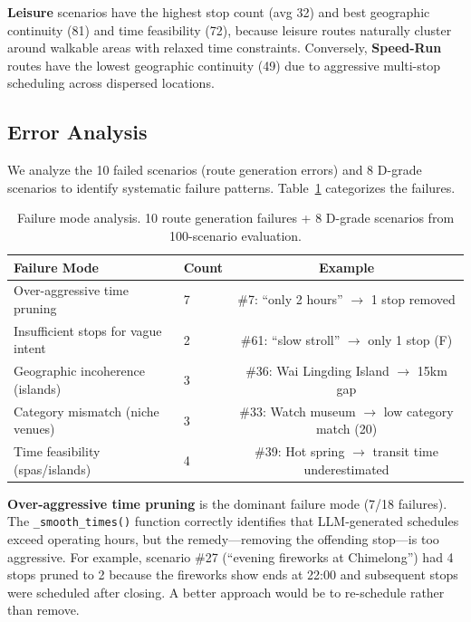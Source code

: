 \textbf{Leisure} scenarios have the highest stop count (avg 32) and best geographic continuity (81) and time feasibility (72), because leisure routes naturally cluster around walkable areas with relaxed time constraints. Conversely, \textbf{Speed-Run} routes have the lowest geographic continuity (49) due to aggressive multi-stop scheduling across dispersed locations.

\subsection{Error Analysis}

We analyze the 10 failed scenarios (route generation errors) and 8 D-grade scenarios to identify systematic failure patterns. Table~\ref{tab:error_analysis} categorizes the failures.

\begin{table}[H]
\centering
\caption{Failure mode analysis. 10 route generation failures + 8 D-grade scenarios from 100-scenario evaluation.}
\label{tab:error_analysis}
\begin{tabular}{@{}llc@{}}
\toprule
\textbf{Failure Mode} & \textbf{Count} & \textbf{Example} \\
\midrule
Over-aggressive time pruning & 7 & \#7: ``only 2 hours'' $\rightarrow$ 1 stop removed \\
Insufficient stops for vague intent & 2 & \#61: ``slow stroll'' $\rightarrow$ only 1 stop (F) \\
Geographic incoherence (islands) & 3 & \#36: Wai Lingding Island $\rightarrow$ 15km gap \\
Category mismatch (niche venues) & 3 & \#33: Watch museum $\rightarrow$ low category match (20) \\
Time feasibility (spas/islands) & 4 & \#39: Hot spring $\rightarrow$ transit time underestimated \\
\bottomrule
\end{tabular}
\end{table}

\textbf{Over-aggressive time pruning} is the dominant failure mode (7/18 failures). The \texttt{\_smooth\_times()} function correctly identifies that LLM-generated schedules exceed operating hours, but the remedy---removing the offending stop---is too aggressive. For example, scenario \#27 (``evening fireworks at Chimelong'') had 4 stops pruned to 2 because the fireworks show ends at 22:00 and subsequent stops were scheduled after closing. A better approach would be to re-schedule rather than remove.

